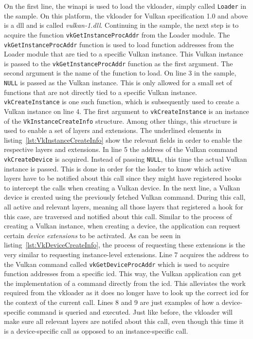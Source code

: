     On the first line, the \gls{winapi} is used to load the \gls{vkloader}, simply called \lstinline{Loader} in the sample.
    On this platform, the \gls{vkloader} for Vulkan specification 1.0 and above is a \gls{dll} and is called \textit{vulkan-1.dll}.
    Continuing in the sample, the next step is to acquire the function \lstinline{vkGetInstanceProcAddr} from the Loader module.
    The \lstinline{vkGetInstanceProcAddr} function is used to load function addresses from the Loader module that are tied to a specific Vulkan instance.
    This Vulkan instance is passed to the \lstinline{vkGetInstanceProcAddr} function as the first argument.
    The second argument is the name of the function to load.
    On line 3 in the sample, \lstinline{NULL} is passed as the Vulkan instance.
    This is only allowed for a small set of functions that are not directly tied to a specific Vulkan instance.
    \lstinline{vkCreateInstance} is one such function, which is subsequently used to create a Vulkan instance on line 4.
    The first argument to \lstinline{vkCreateInstance} is an instance of the \lstinline{VkInstanceCreateInfo} structure.
    Among other things, this structure is used to enable a set of layers and extensions.
    The underlined elements in listing~\ref{lst:VkInstanceCreateInfo} show the relevant fields in order to enable the respective layers and extensions.
    In line 5 the address of the Vulkan command \lstinline{vkCreateDevice} is acquired.
    Instead of passing \lstinline{NULL}, this time the actual Vulkan instance is passed.
    This is done in order for the loader to know which active layers have to be notified about this call since they might have registered hooks to intercept the calls when creating a Vulkan device.
    In the next line, a Vulkan device is created using the previously fetched Vulkan command.
    During this call, all active and relevant layers, meaning all those layers that registered a hook for this case, are traversed and notified about this call.
    Similar to the process of creating a Vulkan instance, when creating a device, the application can request certain \textit{device extensions} to be activated.
    As can be seen in listing~\ref{lst:VkDeviceCreateInfo}, the process of requesting these extensions is the very similar to requesting instance-level extensions.
    Line 7 acquires the address to the Vulkan command called \lstinline{vkGetDeviceProcAddr} which is used to acquire function addresses from a specific \gls{icd}.
    This way, the Vulkan application can get the implementation of a command directly from the \gls{icd}.
    This alleviates the work required from the \gls{vkloader} as it does no longer have to look up the correct \gls{icd} for the context of the current call.
    Lines 8 and 9 are just examples of how a device-specific command is queried and executed.
    Just like before, the \gls{vkloader} will make sure all relevant layers are notifed about this call, even though this time it is a device-specific call as opposed to an instance-specific call.

